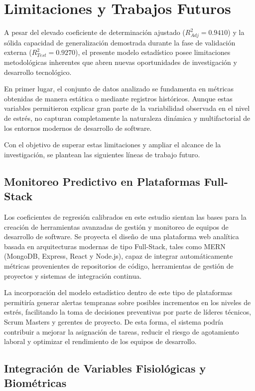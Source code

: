 \documentclass[conference]{IEEEtran}
\begin{document}
\section{Limitaciones y Trabajos Futuros}

A pesar del elevado coeficiente de determinación ajustado
($R^2_{Adj}=0.9410$) y la sólida capacidad de generalización
demostrada durante la fase de validación externa
($R^2_{Test}=0.9270$), el presente modelo estadístico posee
limitaciones metodológicas inherentes que abren nuevas
oportunidades de investigación y desarrollo tecnológico.

En primer lugar, el conjunto de datos analizado se fundamenta
en métricas obtenidas de manera estática o mediante registros
históricos. Aunque estas variables permitieron explicar gran
parte de la variabilidad observada en el nivel de estrés, no
capturan completamente la naturaleza dinámica y multifactorial
de los entornos modernos de desarrollo de software.

Con el objetivo de superar estas limitaciones y ampliar el
alcance de la investigación, se plantean las siguientes líneas
de trabajo futuro.

\subsection{Monitoreo Predictivo en Plataformas Full-Stack}

Los coeficientes de regresión calibrados en este estudio
sientan las bases para la creación de herramientas avanzadas
de gestión y monitoreo de equipos de desarrollo de software.
Se proyecta el diseño de una plataforma web analítica basada
en arquitecturas modernas de tipo Full-Stack, tales como
MERN (MongoDB, Express, React y Node.js), capaz de
integrar automáticamente métricas provenientes de repositorios
de código, herramientas de gestión de proyectos y sistemas de
integración continua.

La incorporación del modelo estadístico dentro de este tipo de
plataformas permitiría generar alertas tempranas sobre posibles
incrementos en los niveles de estrés, facilitando la toma de
decisiones preventivas por parte de líderes técnicos, Scrum
Masters y gerentes de proyecto. De esta forma, el sistema
podría contribuir a mejorar la asignación de tareas, reducir el
riesgo de agotamiento laboral y optimizar el rendimiento de
los equipos de desarrollo.

\subsection{Integración de Variables Fisiológicas y Biométricas}
\end{document}
